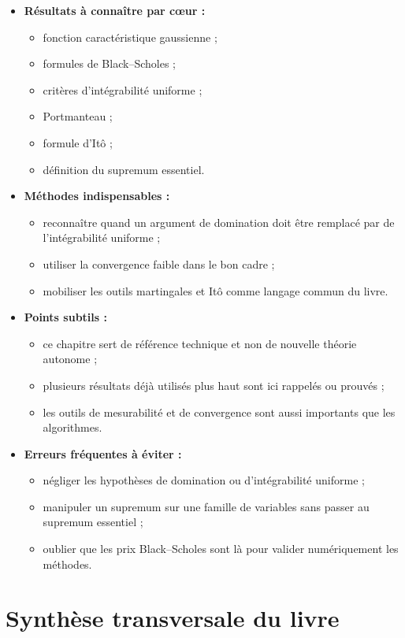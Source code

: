 \documentclass[11pt,a4paper]{article}
\begin{document}
\begin{itemize}
  \item \textbf{Résultats à connaître par cœur :}
  \begin{itemize}
    \item fonction caractéristique gaussienne ;
    \item formules de Black--Scholes ;
    \item critères d'intégrabilité uniforme ;
    \item Portmanteau ;
    \item formule d'Itô ;
    \item définition du supremum essentiel.
  \end{itemize}
  \item \textbf{Méthodes indispensables :}
  \begin{itemize}
    \item reconnaître quand un argument de domination doit être remplacé par de l'intégrabilité uniforme ;
    \item utiliser la convergence faible dans le bon cadre ;
    \item mobiliser les outils martingales et Itô comme langage commun du livre.
  \end{itemize}
  \item \textbf{Points subtils :}
  \begin{itemize}
    \item ce chapitre sert de référence technique et non de nouvelle théorie autonome ;
    \item plusieurs résultats déjà utilisés plus haut sont ici rappelés ou prouvés ;
    \item les outils de mesurabilité et de convergence sont aussi importants que les algorithmes.
  \end{itemize}
  \item \textbf{Erreurs fréquentes à éviter :}
  \begin{itemize}
    \item négliger les hypothèses de domination ou d'intégrabilité uniforme ;
    \item manipuler un supremum sur une famille de variables sans passer au supremum essentiel ;
    \item oublier que les prix Black--Scholes sont là pour valider numériquement les méthodes.
  \end{itemize}
\end{itemize}

\section{Synthèse transversale du livre}
\end{document}
